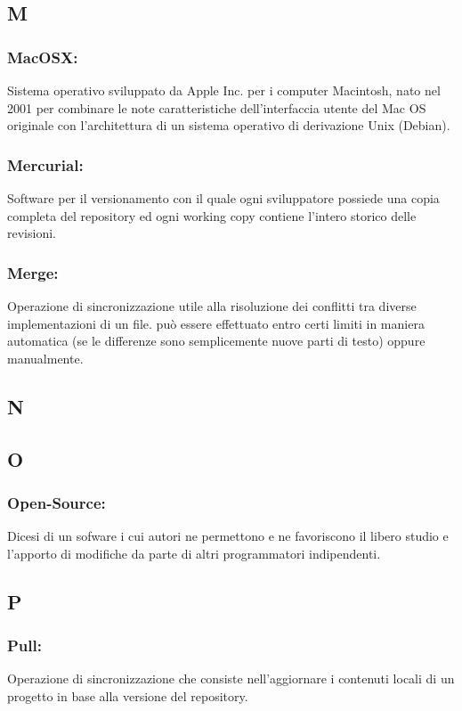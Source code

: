 \subsection*{\huge{M}}
\subsubsection*{MacOSX:} Sistema operativo sviluppato da Apple Inc. per i
computer Macintosh, nato nel 2001 per combinare le note caratteristiche
dell'interfaccia utente del Mac OS originale con l'architettura di un sistema
operativo di derivazione Unix (Debian).

\subsubsection*{Mercurial:} Software per il versionamento con il quale ogni
sviluppatore possiede una copia completa del repository ed ogni working copy
contiene l'intero storico delle revisioni.

\subsubsection*{Merge:} Operazione di sincronizzazione utile alla risoluzione
dei conflitti tra diverse implementazioni di un file. pu\`o essere effettuato
entro certi limiti in maniera automatica (se le differenze sono semplicemente
nuove parti di testo) oppure manualmente.

\subsection*{\huge{N}}

\subsection*{\huge{O}}
\subsubsection*{Open-Source:} Dicesi di un sofware i cui autori ne permettono e
ne favoriscono il libero studio e l'apporto di modifiche da parte di altri programmatori indipendenti.
\subsection*{\huge{P}}

\subsubsection*{Pull:} Operazione di sincronizzazione che consiste
nell'aggiornare i contenuti locali di un progetto in base alla versione del repository.

